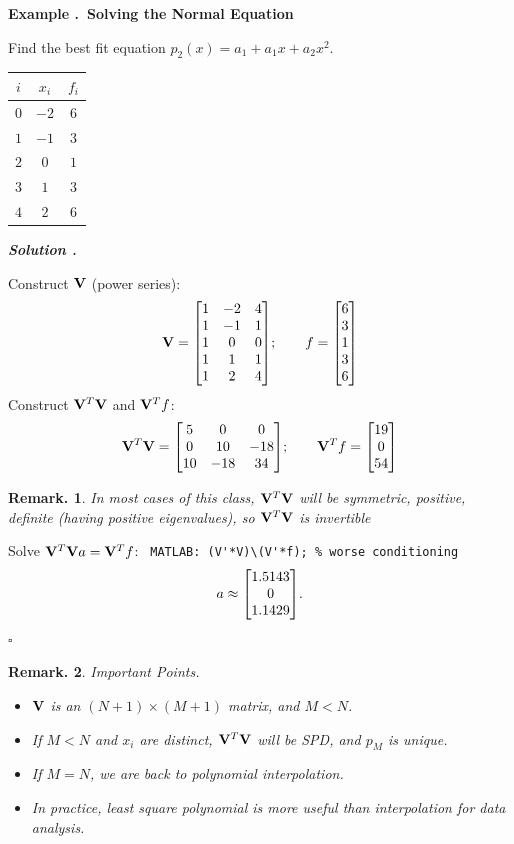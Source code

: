 \documentclass[12pt, a4paper]{article}
\newcounter{index}[subsection]
\newenvironment*{eg}[1]{\begin{framed}\par\noindent\textbf{Example \thesubsection.\stepcounter{index}\theindex\ #1} \par}{\par\end{framed}}
\newcounter{nprf}[subsection]
\newenvironment*{sol}{\par\indent\textbf{\textit{Solution \stepcounter{nprf}\thenprf.}}\par}{\hfill{$\square$}\par}
\newtheorem{rmk}{Remark.}[section]
\begin{document}
\begin{eg}{Solving the Normal Equation}
	Find the best fit equation $p_2(x)=a_1+a_1x+a_2x^2$.
	\begin{center}\begin{tabular}{c|c|c}$i$&$x_i$&$f_i$\\\hline$0$&$-2$&$6$\\$1$&$-1$&$3$\\$2$&$0$&$1$\\$3$&$1$&$3$\\$4$&$2$&$6$\end{tabular}\end{center}
	\begin{sol}
		Construct $\vb V$ (power series): \[\vb V=\mqty[1&-2&4\\1&-1&1\\1&0&0\\1&1&1\\1&2&4];\qquad f=\mqty[6\\3\\1\\3\\6]\]	 Construct $\vb V^T\vb V$ and $\vb V^Tf$: \[\vb V^T\vb V=\mqty[5&0&0\\0&10&-18\\10&-18&34];\qquad\vb V^Tf=\mqty[19\\0\\54]\]
		\begin{rmk} In most cases of this class, $\vb V^T\vb V$ will be symmetric, positive, definite (having positive eigenvalues), so $\vb V^T\vb V$ is invertible\end{rmk}
		Solve $\vb V^T\vb Va=\vb V^Tf$: \verb| MATLAB: (V'*V)\(V'*f); % worse conditioning| \[a\approx\mqty[1.5143\\0\\1.1429].\]
	\end{sol}
\end{eg}
\begin{rmk}
	Important Points.
	\begin{itemize}
		\item $\vb V$ is an $(N+1)\times(M+1)$ matrix, and $M<N$.
		\item If $M<N$ and $x_i$ are distinct, $\vb V^T\vb V$ will be SPD, and $p_M$ is unique. 
		\item If $M=N$, we are back to polynomial interpolation.
		\item In practice, least square polynomial is more useful than interpolation for data analysis.
	\end{itemize}	
\end{rmk}
\end{document}
